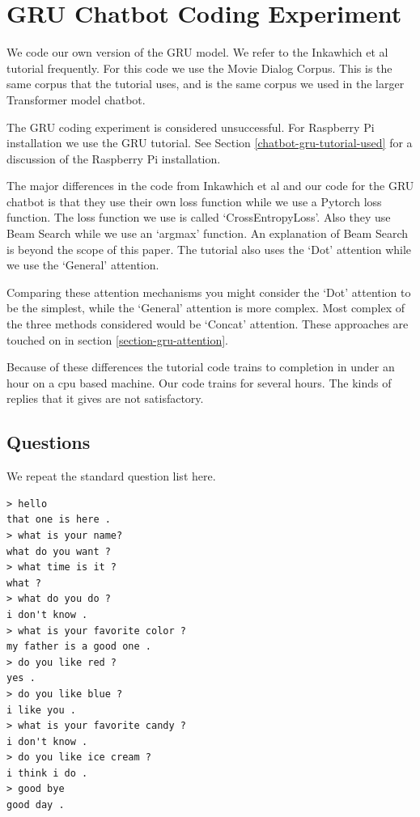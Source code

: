 

\section{GRU Chatbot Coding Experiment}

We code our own version of the GRU model. We refer to the Inkawhich et al \cite{2018Inkawhich} tutorial frequently. For this code we use the Movie Dialog Corpus. This is the same corpus that the tutorial uses, and is the same corpus we used in the larger Transformer model chatbot.

The GRU coding experiment is considered unsuccessful. For Raspberry Pi installation we use the GRU tutorial. See Section \ref{chatbot-gru-tutorial-used} for a discussion of the Raspberry Pi installation. %

The major differences in the code from Inkawhich et al %
and our code for the GRU chatbot is that they use their own loss function while we use a Pytorch loss function. The loss function we use is called `CrossEntropyLoss'. Also they use Beam Search while we use an `argmax' function. An explanation of Beam Search is beyond the scope of this paper. The tutorial also uses the `Dot' attention while we use the `General' attention. 

Comparing these attention mechanisms you might consider the `Dot' attention to be the simplest, while the `General' attention is more complex. Most complex of the three methods considered would be `Concat' attention. These approaches are touched on in section \ref{section-gru-attention}.

Because of these differences the tutorial code trains to completion in under an hour on a cpu based machine. Our code trains for several hours. The kinds of replies that it gives are not  satisfactory.

\subsection{Questions}
We repeat the standard question list here.


\begin{verbatim}
> hello
that one is here .
> what is your name?
what do you want ?
> what time is it ?
what ?
> what do you do ?
i don't know .
> what is your favorite color ?
my father is a good one .
> do you like red ?
yes .
> do you like blue ?
i like you .
> what is your favorite candy ?
i don't know .
> do you like ice cream ?
i think i do .
> good bye
good day .
\end{verbatim}


